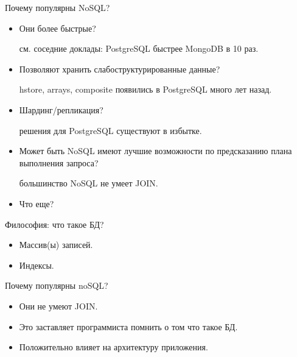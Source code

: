 \documentclass[aspectratio=169]{beamer}
\begin{document}
\begin{frame}{Почему популярны NoSQL?}
    \begin{itemize}
        \pause\item Они более быстрые?
            \pause\par см. соседние доклады:
                PostgreSQL быстрее MongoDB в 10 раз.

        \pause\item Позволяют хранить слабоструктурированные данные?
            \pause\par hstore, arrays, composite появились в PostgreSQL
                много лет назад.

        \pause\item Шардинг/репликация?
            \pause\par решения для PostgreSQL существуют в избытке.

        \pause\item Может быть NoSQL имеют лучшие возможности
            по предсказанию плана выполнения запроса?
            \pause\par большинство NoSQL не умеет JOIN.

        \item Что еще?
    \end{itemize}
\end{frame}

\begin{frame}{Философия: что такое БД?}
    \begin{itemize}
        \item Массив(ы) записей.
        \item Индексы.
    \end{itemize}
\end{frame}

\begin{frame}{Почему популярны noSQL?}
    \begin{itemize}
        \pause\item Они не умеют JOIN.
        \pause\item Это заставляет программиста помнить о том что такое БД.
        \pause\item Положительно влияет на архитектуру приложения.
    \end{itemize}
\end{frame}
\end{document}

